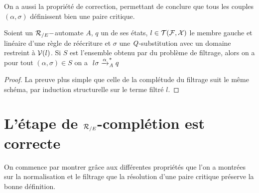 On a aussi la propriété de correction, permettant de conclure que tous les couples $(\alpha,\sigma)$ définissent bien une paire critique.
\begin{property}
  \label{prop:matching-correct}
  Soient un ${\mathcal R_{/E}}-$automate $A$, $q$ un de ses états, $l \in \mathcal{T(F, X)}$ le
  membre gauche et linéaire d'une règle de réécriture et $\sigma$ une
  $\mathit Q$-substitution avec un domaine restreint à $\mathcal V(l)$.  Si $S$
  est l'ensemble obtenu par du problème de filtrage, alors on a pour
  tout $(\alpha, \sigma) \in S$ on a $\ l\sigma \xrightarrow{\alpha}_\mathit A^* q$
\end{property}
\begin{proof}
  La preuve plus simple que celle de la complétude du filtrage suit le même schéma, par induction structurelle 
  sur le terme filtré $l$.
\end{proof}



\section{L'étape de ${\mathcal R_{/E}}$-complétion est correcte}

On commence par montrer grâce aux différentes propriétés que l'on a montrées sur la 
normalisation et le filtrage que la résolution d'une paire critique préserve la
bonne définition.

